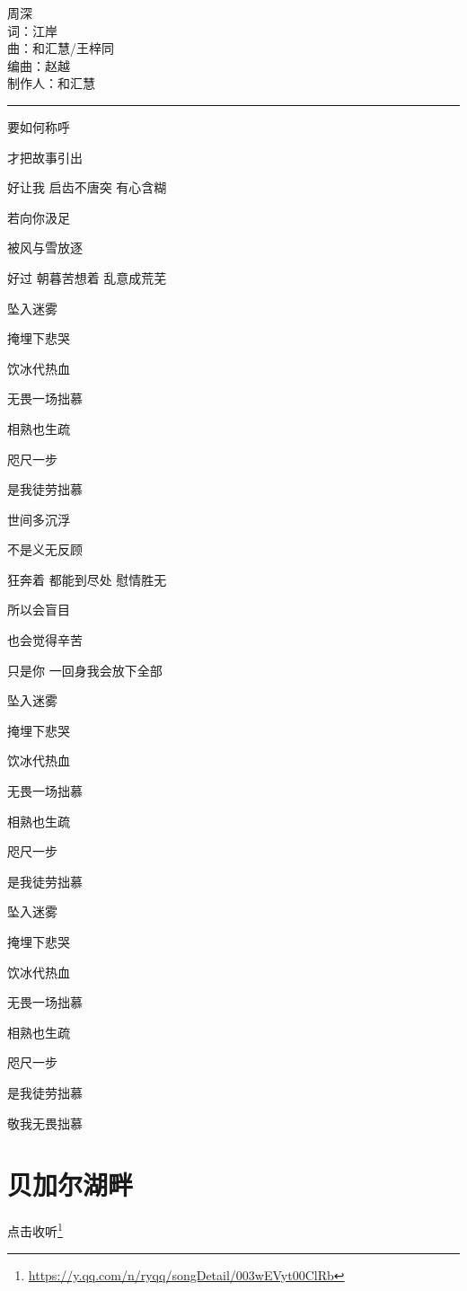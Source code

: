 \documentclass[]{ctexbook}
\renewcommand{\href}[2]{#2\footnote{\url{#1}}}
\begin{document}
周深\\
词：江岸\\
曲：和汇慧/王梓同\\
编曲：赵越\\
制作人：和汇慧

\begin{center}\rule{0.5\linewidth}{0.5pt}\end{center}

要如何称呼

才把故事引出

好让我 启齿不唐突 有心含糊

若向你汲足

被风与雪放逐

好过 朝暮苦想着 乱意成荒芜

坠入迷雾

掩埋下悲哭

饮冰代热血

无畏一场拙慕

相熟也生疏

咫尺一步

是我徒劳拙慕

世间多沉浮

不是义无反顾

狂奔着 都能到尽处 慰情胜无

所以会盲目

也会觉得辛苦

只是你 一回身我会放下全部

坠入迷雾

掩埋下悲哭

饮冰代热血

无畏一场拙慕

相熟也生疏

咫尺一步

是我徒劳拙慕

坠入迷雾

掩埋下悲哭

饮冰代热血

无畏一场拙慕

相熟也生疏

咫尺一步

是我徒劳拙慕

敬我无畏拙慕

\section*{贝加尔湖畔}\label{lake-baikal}


\href{https://y.qq.com/n/ryqq/songDetail/003wEVyt00ClRb}{点击收听}
\end{document}
